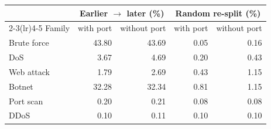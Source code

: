 \begin{tabular}{lrrrr}
\toprule
 & \multicolumn{2}{c}{Earlier $\rightarrow$ later (\%)} & \multicolumn{2}{c}{Random re-split (\%)} \\ \cmidrule(lr){2-3}\cmidrule(lr){4-5}
Family & with port & without port & with port & without port \\
\midrule
Brute force & 43.80 & 43.69 & 0.05 & 0.16 \\
DoS & 3.67 & 4.69 & 0.20 & 0.43 \\
Web attack & 1.79 & 2.69 & 0.43 & 1.15 \\
Botnet & 32.28 & 32.34 & 0.81 & 1.15 \\
Port scan & 0.20 & 0.21 & 0.08 & 0.08 \\
DDoS & 0.10 & 0.11 & 0.10 & 0.10 \\
\bottomrule
\end{tabular}
